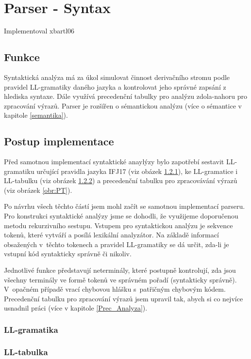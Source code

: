 \documentclass[11pt,a4paper]{article}
\begin{document}
	\newpage


\section{Parser - Syntax}
    Implementoval xbartl06

    \subsection{Funkce}
    Syntaktická analýza má za úkol simulovat činnost derivačního stromu podle pravidel LL-gramatiky daného jazyka a kontrolovat jeho správné zapsání z hlediska syntaxe. Dále využívá precedenční tabulky pro analýzu zdola-nahoru pro zpracování výrazů. Parser je rozšířen o sémantickou analýzu (více o sémantice v kapitole \ref{semantika}).


    \subsection{Postup implementace}
    Před samotnou implementací syntaktické anaylýzy bylo zapotřebí sestavit LL-gramatiku určující pravidla jazyka IFJ17 (viz obázek \ref{LL_Gramatika}), ke LL-gramatice i LL-tabulku (viz obrázek \ref{LL_Tabulka}) a precedenční tabulku pro zpracovávání výrazů (viz obrázek \ref{obr:PT}).

    Po návrhu všech těchto částí jsem mohl začít se samotnou implementací parseru. Pro konstrukci syntaktické analýzy jsme se dohodli, že využijeme doporučenou metodu rekurzivního sestupu. Vstupem pro syntaktickou analýzu je sekvence tokenů, které vytváří a posílá lexikální analyzátor. Na základě informací obsažených v těchto tokenech a pravidel LL-gramatiky se dá určit, zda-li je vstupní kód syntakticky správně či nikoliv.

    Jednotlivé funkce představují neterminály, které postupně kontrolují, zda jsou všechny terminály ve formě tokenů ve správném pořadí (syntakticky správně). V opačném případě vrací chybovou hlášku s patřičným chybovým kódem. Precedenční tabulku pro zpracování výrazů jsem upravil tak, abych si co nejvíce usnadnil práci (více v kapitole \ref{Prec_Analyza}).


        \subsubsection{LL-gramatika} \label{LL_Gramatika}

        \subsubsection{LL-tabulka} \label{LL_Tabulka}
\end{document}
